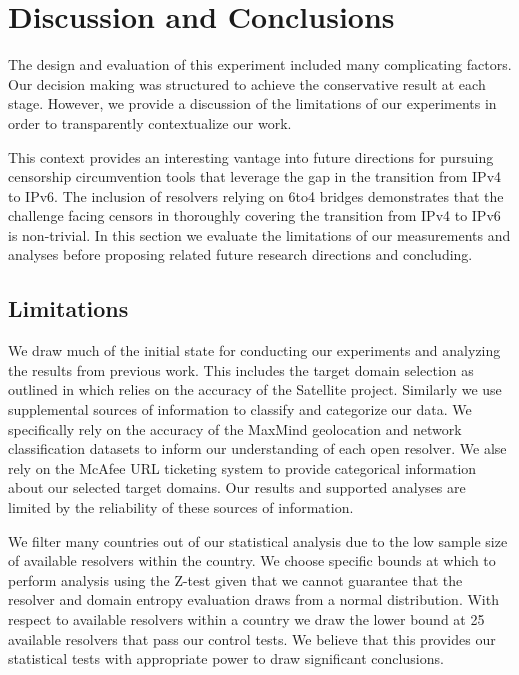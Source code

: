 \section{Discussion and Conclusions} \label{sec:discussion}

The design and evaluation of this experiment included many complicating factors.
Our decision making was structured to achieve the conservative result at each
stage. However, we provide a discussion of the limitations of our
experiments in order to transparently contextualize our work.

This context provides an interesting vantage into future directions for
pursuing censorship circumvention tools that leverage the gap in the transition
from IPv4 to IPv6. The inclusion of resolvers relying on 6to4 bridges demonstrates
that the challenge facing censors in thoroughly covering the transition from IPv4
to IPv6 is non-trivial. In this section we evaluate the limitations of our
measurements and analyses before proposing
related future research directions and concluding.

\subsection{Limitations}
\label{sec:discussion:limitations}

We draw much of the initial state for conducting our experiments and analyzing
the results from previous work. This includes the target domain selection as
outlined in  which relies on the accuracy of
the Satellite project. Similarly we use supplemental sources of information to
classify and categorize our data. We specifically rely on the accuracy of the
MaxMind geolocation and network classification datasets to inform our
understanding of each open resolver. We alse rely on the McAfee URL ticketing
system to provide categorical information about our selected target domains.
Our results and supported analyses are limited by the reliability of these
sources of information.

We filter many countries out of our statistical analysis due to the low sample
size of available resolvers within the country. We choose specific
bounds at which to perform analysis using the Z-test given that we cannot guarantee
that the resolver and domain entropy evaluation draws from a normal distribution.
With respect to available resolvers within a country we draw the lower bound at
25 available resolvers that pass our control tests. We believe that this provides
our statistical tests with appropriate power to draw significant conclusions.

